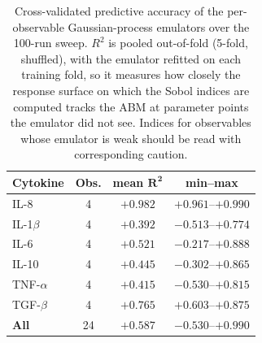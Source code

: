 \begin{table}[h]
\centering\footnotesize
\caption{Cross-validated predictive accuracy of the per-observable Gaussian-process emulators over the 100-run sweep. $R^2$ is pooled out-of-fold (5-fold, shuffled), with the emulator refitted on each training fold, so it measures how closely the response surface on which the Sobol indices are computed tracks the ABM at parameter points the emulator did not see. Indices for observables whose emulator is weak should be read with corresponding caution.}
\label{tab:app_emulator}
\begin{tabular}{lccc}
\toprule
\textbf{Cytokine} & \textbf{Obs.} & \textbf{mean }$\mathbf{R^2}$ & \textbf{min}--\textbf{max} \\
\midrule
IL-8 & 4 & $+0.982$ & $+0.961$--$+0.990$ \\
IL-1$\beta$ & 4 & $+0.392$ & $-0.513$--$+0.774$ \\
IL-6 & 4 & $+0.521$ & $-0.217$--$+0.888$ \\
IL-10 & 4 & $+0.445$ & $-0.302$--$+0.865$ \\
TNF-$\alpha$ & 4 & $+0.415$ & $-0.530$--$+0.815$ \\
TGF-$\beta$ & 4 & $+0.765$ & $+0.603$--$+0.875$ \\
\midrule
\textbf{All} & 24 & $\mathbf{+0.587}$ & $-0.530$--$+0.990$ \\
\bottomrule
\end{tabular}
\end{table}
